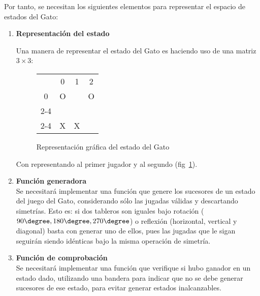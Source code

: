 Por tanto, se necesitan los siguientes elementos para representar el espacio de estados del Gato:

\begin{enumerate}
  \item \textbf{Representación del estado} \hfill\par
    Una manera de representar el estado del Gato es haciendo uso de una matriz $3 \times 3$:\medskip
    

    \begin{figure}[h!]
      \begin{center}
        \begin{tabular}{c l | l | l }
           & \multicolumn{1}{c}{\tiny{0}} & \multicolumn{1}{c}{\tiny{1}} & \multicolumn{1}{c}{\tiny{2}} \\
           \multicolumn{1}{c}{\tiny{0}} & O &   & O \\ \cline{2-4}
           \multicolumn{1}{c}{\tiny{1}} &   &   &   \\ \cline{2-4}
           \multicolumn{1}{c}{\tiny{2}} & X & X &
        \end{tabular}
      \end{center}
      \caption{Representación gráfica del estado del Gato}
      \label{fig:representacionestado}
    \end{figure}

    Con  representando al primer jugador y  al segundo (fig~\ref{fig:representacionestado}).


  \item \textbf{Función generadora}\hfill \\
    Se necesitará implementar una función que genere los sucesores de un estado del juego del Gato, considerando sólo las jugadas válidas y descartando simetrías.  Esto es: si dos tableros son iguales bajo rotación ($90\degree, 180\degree, 270\degree$) o reflexión (horizontal, vertical y diagonal) basta con generar uno de ellos, pues las jugadas que le sigan seguirán siendo idénticas bajo la misma operación de simetría. 

  \item \textbf{Función de comprobación} \hfill \\
    Se necesitará implementar una función que verifique si hubo ganador en un estado dado, utilizando una bandera para indicar que no se debe generar sucesores de ese estado, para evitar generar estados inalcanzables.
\end{enumerate}


